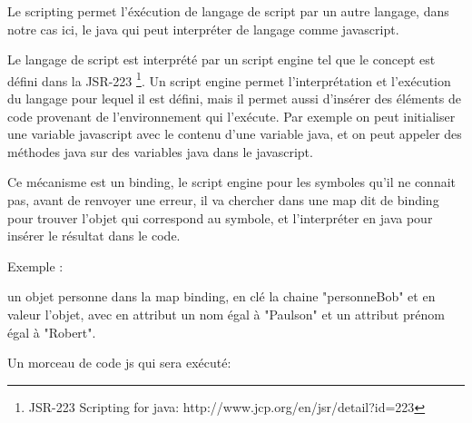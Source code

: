 Le scripting permet l'éxécution de langage de script par un autre langage, dans
notre cas ici, le java qui peut interpréter de langage comme javascript.

Le langage de script est interprété par un script engine tel que le concept est 
défini dans la JSR-223 \footnote{JSR-223 Scripting for java: http://www.jcp.org/en/jsr/detail?id=223}. 
Un script engine permet l'interprétation et l'exécution
du langage pour lequel il est défini, mais il permet aussi d'insérer des éléments
de code provenant de l'environnement qui l'exécute. Par exemple on peut initialiser
une variable javascript avec le contenu d'une variable java, et on peut appeler 
des méthodes java sur des variables java dans le javascript.

Ce mécanisme est un binding, le script engine pour les symboles qu'il ne connait
pas, avant de renvoyer une erreur, il va chercher dans une map dit de binding 
pour trouver l'objet qui correspond au symbole, et l'interpréter en java pour
insérer le résultat dans le code.

Exemple :

un objet personne dans la map binding, en clé la chaine "personneBob" et en valeur 
l'objet, avec en attribut un nom égal à "Paulson" et un attribut prénom égal à
"Robert".

Un morceau de code js qui sera exécuté:



